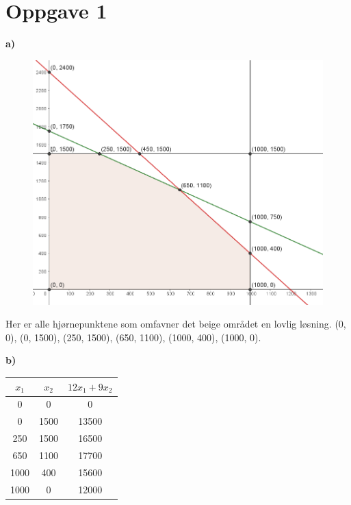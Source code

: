 \documentclass{article}
\begin{document}
    

    \section*{\textbf{Oppgave 1}}
    \small\textbf{a)}
    \begin{figure}[ht]
        \includegraphics*[width=\linewidth]{img/1a.PNG}
    \end{figure}
    
    
    Her er alle hjørnepunktene som omfavner det beige området en lovlig løsning. (0, 0), (0, 1500), (250, 1500), (650, 1100), (1000, 400), (1000, 0).

    \small\textbf{b)}
    
    \begin{table}[h!]
        \centering
        \begin{tabular}{|c|c|c|}
            \hline
            $x_1$ & $x_2 $ & $12x_1 + 9x_2$ \\\hline
            0 & 0 & 0 \\\hline
            0 & 1500 & 13500 \\\hline
            250 & 1500 & 16500 \\\hline
            650 & 1100 & 17700 \\\hline
            1000 & 400 & 15600 \\\hline
            1000 & 0 & 12000 \\\hline
        \end{tabular}
    \end{table}
    
\end{document}
